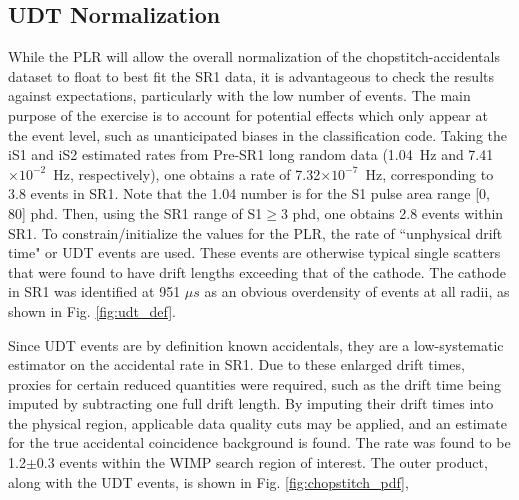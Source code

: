
\subsection{UDT Normalization}

While the PLR will allow the overall normalization of the chopstitch-accidentals dataset to float to best fit the SR1 data, it is advantageous to check the results against expectations, particularly with the low number of events.
The main purpose of the exercise is to account for potential effects which only appear at the event level, such as unanticipated biases in the classification code.
Taking the iS1 and iS2 estimated rates from Pre-SR1 long random data (1.04~Hz and 7.41$\times 10^{-2}$~Hz, respectively), one obtains a rate of 7.32$\times 10^{-7}$~Hz, corresponding to 3.8 events in SR1.
Note that the 1.04 number is for the S1 pulse area range [0, 80] phd.
Then, using the SR1 range of S1$\geq3$ phd, one obtains 2.8 events within SR1.
To constrain/initialize the values for the PLR, the rate of ``unphysical drift time" or UDT events are used.
These events are otherwise typical single scatters that were found to have drift lengths exceeding that of the cathode.
The cathode in SR1 was identified at 951 $\mu s$ as an obvious overdensity of events at all radii, as shown in Fig. \ref{fig:udt_def}.

Since UDT events are by definition known accidentals, they are a low-systematic estimator on the accidental rate in SR1.
Due to these enlarged drift times, proxies for certain reduced quantities were required, such as the drift time being imputed by subtracting one full drift length.
By imputing their drift times into the physical region, applicable data quality cuts may be applied, and an estimate for the true accidental coincidence background is found.
The rate was found to be 1.2$\pm 0.3$ events within the WIMP search region of interest.
The outer product, along with the UDT events, is shown in Fig. \ref{fig:chopstitch_pdf},

